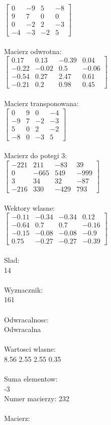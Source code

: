 \documentclass[a4paper,12pt]{article}
\begin{document}
$\begin{bmatrix} 0&-9&5&-8\\9&7&0&0\\0&-2&2&-3\\-4&-3&-2&5 \end{bmatrix}$
\\
\\
Macierz odwrotna:\\

$\begin{bmatrix} 0.17&0.13&-0.39&0.04\\-0.22&-0.02&0.5&-0.06\\-0.54&0.27&2.47&0.61\\-0.21&0.2&0.98&0.45 \end{bmatrix}$
\\
\\
Macierz transponowana:\\

$\begin{bmatrix} 0&9&0&-4\\-9&7&-2&-3\\5&0&2&-2\\-8&0&-3&5 \end{bmatrix}$
\\
\\
Macierz do potegi 3:\\

$\begin{bmatrix} -221&211&-83&39\\0&-665&549&-999\\3&34&32&-87\\-216&330&-429&793 \end{bmatrix}$
\\
\\
Wektory wlasne:\\

$\begin{bmatrix} -0.11&-0.34&-0.34&0.12\\-0.64&0.7&0.7&-0.16\\-0.15&-0.08&-0.08&-0.9\\0.75&-0.27&-0.27&-0.39 \end{bmatrix}$
\\
\\
Slad:\\
14
\\
\\
Wyznacznik:\\
161
\\
\\
Odwracalnosc:\\
Odwracalna
\\
\\
Wartosci wlasne:\\
8.56 2.55 2.55 0.35
\\
\\
Suma elementow:\\
-3
\\
\newpage
Numer macierzy:
232
\\
\\
Macierz:\\
\end{document}
